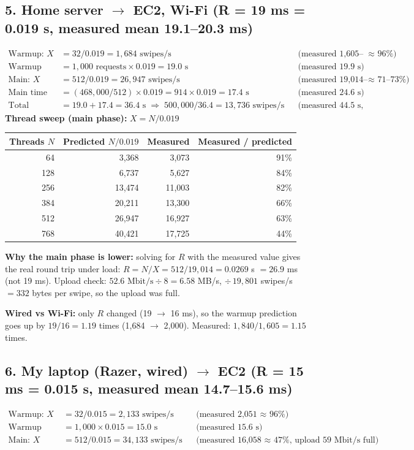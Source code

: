 \documentclass[10pt]{article}
\begin{document}
{\subsection*{5. Home server $\to$ EC2, Wi-Fi (R = 19 ms = 0.019 s, measured mean 19.1--20.3 ms)}
\begin{align*}
\text{Warmup: } X &= 32 / 0.019 = 1{,}684 \text{ swipes/s} &&\text{(measured 1,605--1,629 $\approx$ 96\%)}\\
\text{Warmup time} &= 1{,}000 \text{ requests} \times 0.019 = 19.0 \text{ s} &&\text{(measured 19.9 s)}\\
\text{Main: } X &= 512 / 0.019 = 26{,}947 \text{ swipes/s} &&\text{(measured 19,014--19,801 $\approx$ 71--73\%)}\\
\text{Main time} &= (468{,}000 / 512) \times 0.019 = 914 \times 0.019 = 17.4 \text{ s} &&\text{(measured 24.6 s)}\\
\text{Total} &= 19.0 + 17.4 = 36.4 \text{ s} \;\Rightarrow\; 500{,}000 / 36.4 = 13{,}736 \text{ swipes/s} &&\text{(measured 44.5 s, 11,226/s)}
\end{align*}
\textbf{Thread sweep (main phase):} $X = N / 0.019$
\begin{center}
\begin{tabular}{rrrr}
\toprule
Threads $N$ & Predicted $N/0.019$ & Measured & Measured / predicted \\
\midrule
64 & 3,368 & 3,073 & 91\% \\
128 & 6,737 & 5,627 & 84\% \\
256 & 13,474 & 11,003 & 82\% \\
384 & 20,211 & 13,300 & 66\% \\
512 & 26,947 & 16,927 & 63\% \\
768 & 40,421 & 17,725 & 44\% \\
\bottomrule
\end{tabular}
\end{center}
\textbf{Why the main phase is lower:} solving for $R$ with the measured value gives the real round trip under load: $R = N/X = 512 / 19{,}014 = 0.0269$ s $= 26.9$ ms (not 19 ms). Upload check: $52.6 \text{ Mbit/s} \div 8 = 6.58$ MB/s, $\div\, 19{,}801$ swipes/s $= 332$ bytes per swipe, so the upload was full.

\textbf{Wired vs Wi-Fi:} only $R$ changed (19 $\to$ 16 ms), so the warmup prediction goes up by $19/16 = 1.19$ times (1,684 $\to$ 2,000). Measured: $1{,}840 / 1{,}605 = 1.15$ times.

\subsection*{6. My laptop (Razer, wired) $\to$ EC2 (R = 15 ms = 0.015 s, measured mean 14.7--15.6 ms)}
\begin{align*}
\text{Warmup: } X &= 32 / 0.015 = 2{,}133 \text{ swipes/s} &&\text{(measured 2,051 $\approx$ 96\%)}\\
\text{Warmup time} &= 1{,}000 \times 0.015 = 15.0 \text{ s} &&\text{(measured 15.6 s)}\\
\text{Main: } X &= 512 / 0.015 = 34{,}133 \text{ swipes/s} &&\text{(measured 16,058 $\approx$ 47\%, upload 59 Mbit/s full)}
\end{align*}

}
\end{document}

